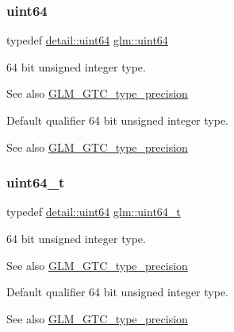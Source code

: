 \subsubsection{\texorpdfstring{uint64}{uint64}}
{\footnotesize\ttfamily typedef \mbox{\hyperlink{namespaceglm_1_1detail_adec4b19bf4982125e122db2fe03c5810}{detail\+::uint64}} \mbox{\hyperlink{group__gtc__type__precision_gae3632bf9b37da66233d78930dd06378a}{glm\+::uint64}}}

64 bit unsigned integer type. \begin{DoxySeeAlso}{See also}
\mbox{\hyperlink{group__gtc__type__precision}{G\+L\+M\+\_\+\+G\+T\+C\+\_\+type\+\_\+precision}}
\end{DoxySeeAlso}
Default qualifier 64 bit unsigned integer type. \begin{DoxySeeAlso}{See also}
\mbox{\hyperlink{group__gtc__type__precision}{G\+L\+M\+\_\+\+G\+T\+C\+\_\+type\+\_\+precision}} 
\end{DoxySeeAlso}
\mbox{\label{group__gtc__type__precision_ga058f57c19e1befdcf12498944bd73e69}} 
\subsubsection{\texorpdfstring{uint64\+\_\+t}{uint64\_t}}
{\footnotesize\ttfamily typedef \mbox{\hyperlink{namespaceglm_1_1detail_adec4b19bf4982125e122db2fe03c5810}{detail\+::uint64}} \mbox{\hyperlink{group__gtc__type__precision_ga058f57c19e1befdcf12498944bd73e69}{glm\+::uint64\+\_\+t}}}

64 bit unsigned integer type. \begin{DoxySeeAlso}{See also}
\mbox{\hyperlink{group__gtc__type__precision}{G\+L\+M\+\_\+\+G\+T\+C\+\_\+type\+\_\+precision}}
\end{DoxySeeAlso}
Default qualifier 64 bit unsigned integer type. \begin{DoxySeeAlso}{See also}
\mbox{\hyperlink{group__gtc__type__precision}{G\+L\+M\+\_\+\+G\+T\+C\+\_\+type\+\_\+precision}} 
\end{DoxySeeAlso}
\mbox{\label{group__gtc__type__precision_ga1a7dcd8aac97cc8020817c94049deff2}} 
